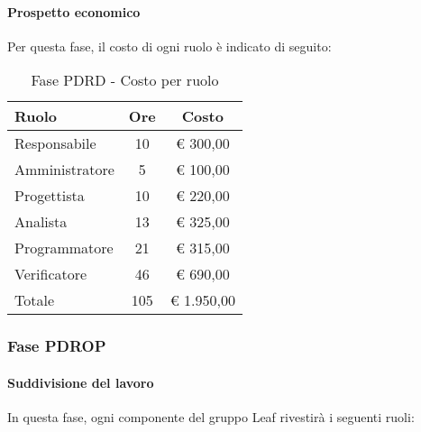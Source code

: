 \documentclass[../PianoProgetto.tex]{subfiles}
\begin{document}
	\paragraph{Prospetto economico}
					Per questa fase, il costo di ogni ruolo è indicato di seguito:
					\begin{table}[h]
		\centering
	
		\begin{tabular}{l * {2}{c}}
			\toprule
			Ruolo & Ore & Costo \\
			\midrule
			Responsabile &	10 & \euro{} 300,00 \\
			\midrule
			Amministratore & 5 & \euro{} 100,00 \\
			\midrule
			Progettista & 10 & \euro{} 220,00 \\
			\midrule
			Analista & 13 & \euro{} 325,00 \\
			\midrule
			Programmatore & 21 & \euro{} 315,00 \\
			\midrule
			Verificatore & 46 & \euro{} 690,00 \\
			\midrule		
			Totale & 105 & \euro{} 1.950,00 \\
			\bottomrule
			
		\end{tabular}
		
		\caption{Fase PDRD - Costo per ruolo}
		\label{tab:fasePDRD_costo}
		
	\end{table}
	
	\subsubsection{Fase PDROP}
				\paragraph{Suddivisione del lavoro}
					In questa fase, ogni componente del gruppo Leaf rivestirà i seguenti ruoli:
	
\end{document}
